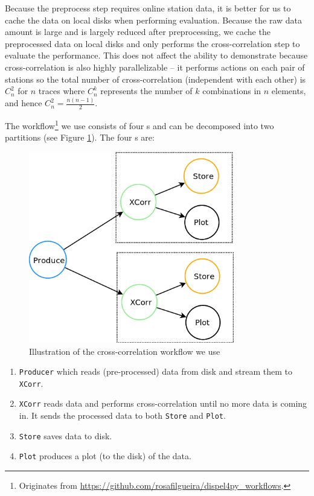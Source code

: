 Because the preprocess step requires online station data, it is better for us to cache the data on local disks when performing evaluation. Because the raw data amount is large and is largely reduced after preprocessing, we cache the preprocessed data on local disks and only performs the cross-correlation step to evaluate the performance. This does not affect the ability to demonstrate because cross-correlation is also highly parallelizable -- it performs actions on each pair of stations so the total number of cross-correlation (independent with each other) is $C^2_n$ for $n$ traces where $C^k_n$ represents the number of $k$ combinations in $n$ elements, and hence $C^2_n=\frac{n(n-1)}{2}$.

The workflow\footnote{Originates from \url{https://github.com/rosafilgueira/dispel4py_workflows}.} we use consists of four \tPETmpl{}s and can be decomposed into two partitions (see Figure \ref{fig:wf_xcorr_us}). The four \tPETmpl{}s are:

\begin{figure}[h]
\centering
    \includegraphics[width=0.8\textwidth]{figures/wf_xcorr_us}
\caption{Illustration of the cross-correlation workflow we use}
\label{fig:wf_xcorr_us}
\end{figure}

\begin{enumerate}
	\item \lstinline|Producer| which reads (pre-processed) data from disk and stream them to \lstinline|XCorr|.
	\item \lstinline|XCorr| reads data and performs cross-correlation until no more data is coming in. It sends the processed data to both \lstinline|Store| and \lstinline|Plot|.
	\item \lstinline|Store| saves data to disk.
	\item \lstinline|Plot| produces a plot (to the disk) of the data.
\end{enumerate}

